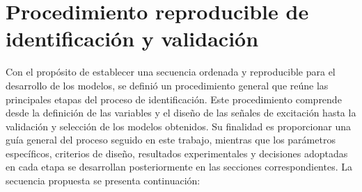 \documentclass[11pt]{report}
\begin{document}
\section{Procedimiento reproducible de identificación y validación}
Con el propósito de establecer una secuencia ordenada y reproducible para el desarrollo de los modelos, se definió un procedimiento general que reúne las principales etapas del proceso de identificación. Este procedimiento comprende desde la definición de las variables y el diseño de las señales de excitación hasta la validación y selección de los modelos obtenidos. Su finalidad es proporcionar una guía general del proceso seguido en este trabajo, mientras que los parámetros específicos, criterios de diseño, resultados experimentales y decisiones adoptadas en cada etapa se desarrollan posteriormente en las secciones correspondientes.
La secuencia propuesta se presenta continuación: 
\end{document}
